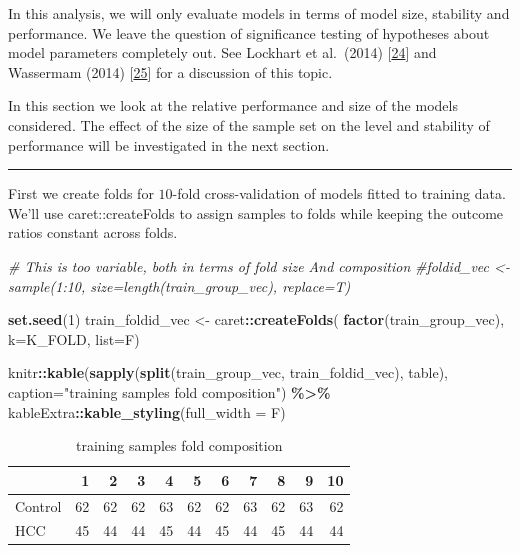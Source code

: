 \documentclass[
]{book}
\newenvironment{Shaded}{\begin{snugshade}}{\end{snugshade}}
\newcommand{\CommentTok}[1]{\textcolor[rgb]{0.56,0.35,0.01}{\textit{#1}}}
\newcommand{\DataTypeTok}[1]{\textcolor[rgb]{0.13,0.29,0.53}{#1}}
\newcommand{\DecValTok}[1]{\textcolor[rgb]{0.00,0.00,0.81}{#1}}
\newcommand{\KeywordTok}[1]{\textcolor[rgb]{0.13,0.29,0.53}{\textbf{#1}}}
\newcommand{\NormalTok}[1]{#1}
\newcommand{\OperatorTok}[1]{\textcolor[rgb]{0.81,0.36,0.00}{\textbf{#1}}}
\newcommand{\StringTok}[1]{\textcolor[rgb]{0.31,0.60,0.02}{#1}}
\begin{document}
In this analysis, we will only evaluate models in terms of
model size, stability and performance. We leave the question
of significance testing of hypotheses about model parameters
completely out. See Lockhart et al.~(2014) {[}\protect\hyperlink{ref-Lockhart:2014aa}{24}{]}
and Wassermam (2014) {[}\protect\hyperlink{ref-Wasserman:2014aa}{25}{]} for a discussion of this topic.

In this section we look at the relative performance and size of the models
considered. The effect of the size of the sample set on the level and
stability of performance will be investigated in the next section.

\begin{center}\rule{0.5\linewidth}{0.5pt}\end{center}

First we create folds for \(10\)-fold cross-validation of models fitted to
training data. We'll use caret::createFolds to assign samples
to folds while keeping the outcome ratios constant across folds.

\begin{Shaded}
\begin{Highlighting}[]
\CommentTok{\# This is too variable, both in terms of fold size And composition}
\CommentTok{\#foldid\_vec <{-} sample(1:10, size=length(train\_group\_vec), replace=T)}

\KeywordTok{set.seed}\NormalTok{(}\DecValTok{1}\NormalTok{)}
\NormalTok{train\_foldid\_vec <{-}}\StringTok{ }\NormalTok{caret}\OperatorTok{::}\KeywordTok{createFolds}\NormalTok{(}
 \KeywordTok{factor}\NormalTok{(train\_group\_vec), }
 \DataTypeTok{k=}\NormalTok{K\_FOLD,}
 \DataTypeTok{list=}\NormalTok{F)}

\NormalTok{knitr}\OperatorTok{::}\KeywordTok{kable}\NormalTok{(}\KeywordTok{sapply}\NormalTok{(}\KeywordTok{split}\NormalTok{(train\_group\_vec, train\_foldid\_vec), }
\NormalTok{  table), }\DataTypeTok{caption=}\StringTok{"training samples fold composition"}\NormalTok{) }\OperatorTok{\%>\%}
\StringTok{   }\NormalTok{kableExtra}\OperatorTok{::}\KeywordTok{kable\_styling}\NormalTok{(}\DataTypeTok{full\_width =}\NormalTok{ F)}
\end{Highlighting}
\end{Shaded}

\begin{table}

\caption{\label{tab:getTrainFolds}training samples fold composition}
\centering
\begin{tabular}[t]{l|r|r|r|r|r|r|r|r|r|r}
\hline
  & 1 & 2 & 3 & 4 & 5 & 6 & 7 & 8 & 9 & 10\\
\hline
Control & 62 & 62 & 62 & 63 & 62 & 62 & 63 & 62 & 63 & 62\\
\hline
HCC & 45 & 44 & 44 & 45 & 44 & 45 & 44 & 45 & 44 & 44\\
\hline
\end{tabular}
\end{table}
\end{document}

